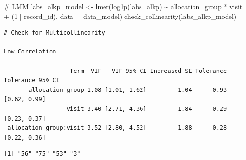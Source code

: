 \documentclass[
  12pt,
]{article}
\newenvironment{Shaded}{\begin{snugshade}}{\end{snugshade}}
\newcommand{\AttributeTok}[1]{\textcolor[rgb]{0.40,0.45,0.13}{#1}}
\newcommand{\CommentTok}[1]{\textcolor[rgb]{0.37,0.37,0.37}{#1}}
\newcommand{\DecValTok}[1]{\textcolor[rgb]{0.68,0.00,0.00}{#1}}
\newcommand{\FunctionTok}[1]{\textcolor[rgb]{0.28,0.35,0.67}{#1}}
\newcommand{\NormalTok}[1]{\textcolor[rgb]{0.00,0.23,0.31}{#1}}
\newcommand{\OtherTok}[1]{\textcolor[rgb]{0.00,0.23,0.31}{#1}}
\newcommand{\SpecialCharTok}[1]{\textcolor[rgb]{0.37,0.37,0.37}{#1}}
\newcommand{\StringTok}[1]{\textcolor[rgb]{0.13,0.47,0.30}{#1}}
\begin{document}
\begin{Shaded}
\begin{Highlighting}[]
\CommentTok{\# LMM}
\NormalTok{labs\_alkp\_model }\OtherTok{\textless{}{-}} \FunctionTok{lmer}\NormalTok{(}\FunctionTok{log1p}\NormalTok{(labs\_alkp) }\SpecialCharTok{\textasciitilde{}}\NormalTok{ allocation\_group }\SpecialCharTok{*}\NormalTok{ visit }\SpecialCharTok{+} 
\NormalTok{(}\DecValTok{1} \SpecialCharTok{|}\NormalTok{ record\_id), }\AttributeTok{data =}\NormalTok{ data\_model)}
\FunctionTok{check\_collinearity}\NormalTok{(labs\_alkp\_model)}
\end{Highlighting}
\end{Shaded}

\begin{verbatim}
# Check for Multicollinearity

Low Correlation

                   Term  VIF   VIF 95% CI Increased SE Tolerance Tolerance 95% CI
       allocation_group 1.08 [1.01, 1.62]         1.04      0.93     [0.62, 0.99]
                  visit 3.40 [2.71, 4.36]         1.84      0.29     [0.23, 0.37]
 allocation_group:visit 3.52 [2.80, 4.52]         1.88      0.28     [0.22, 0.36]
\end{verbatim}

\begin{Shaded}
\end{Shaded}

\begin{verbatim}
[1] "56" "75" "53" "3" 
\end{verbatim}
\end{document}
